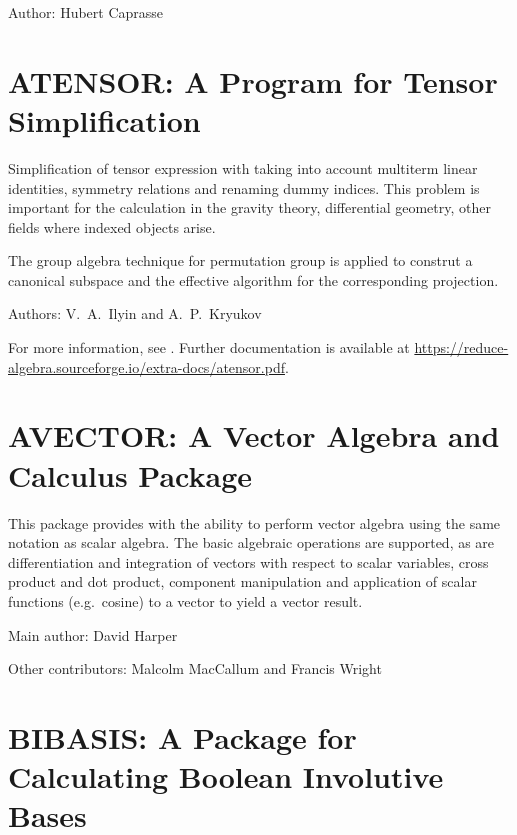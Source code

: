 Author: Hubert Caprasse



\newpage

\section{ATENSOR: A \REDUCE Program for Tensor Simplification}

Simplification of tensor expression with taking into account multiterm linear
identities, symmetry relations and renaming dummy indices. This problem is important
for the calculation in the gravity theory, differential geometry,
other fields where indexed objects arise.

The group algebra technique for permutation group is applied to construt a canonical
subspace and the effective algorithm for the corresponding projection.

Authors: V.~A.~Ilyin and A.~P.~Kryukov

\begin{sloppypar}
  For more information, see \cite{Ilyin:96}.  Further documentation is
  available at
  \url{https://reduce-algebra.sourceforge.io/extra-docs/atensor.pdf}.
\end{sloppypar}

%

\newpage

\section{AVECTOR: A Vector Algebra and Calculus Package}

This package \cite{Harper:89a} provides \REDUCE with the ability to
perform vector algebra using the same notation as scalar algebra.  The
basic algebraic operations are supported, as are differentiation and
integration of vectors with respect to scalar variables, cross product
and dot product, component manipulation and application of scalar
functions (e.g.\ cosine) to a vector to yield a vector result.

Main author: David Harper

Other contributors: Malcolm MacCallum%
 and Francis Wright%



\newpage

\section{BIBASIS: A Package for Calculating Boolean Involutive Bases}
 \label{BIBASIS}

